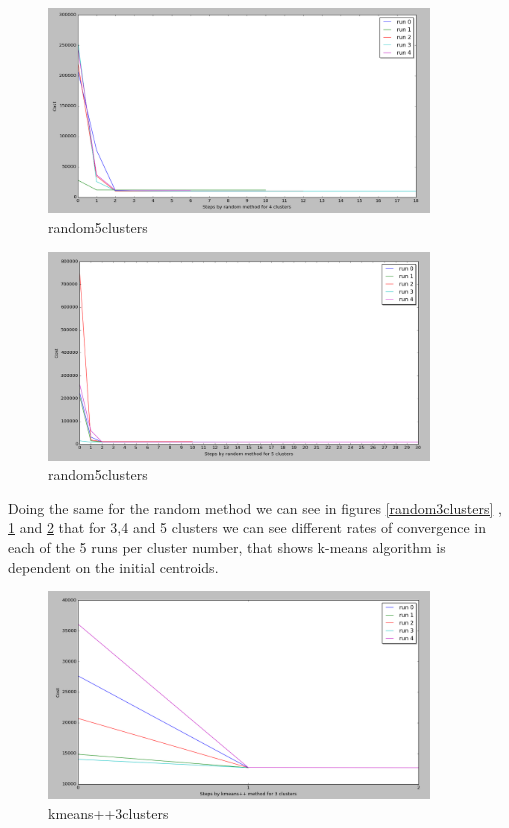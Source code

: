 \begin{figure}[!htb]
\centering
\includegraphics[width=0.9\textwidth]{shots/random4clusters.png}
\caption{ random5clusters}
\label{random4clusters}
\end{figure}



\begin{figure}[!htb]
\centering
\includegraphics[width=0.9\textwidth]{shots/random5clusters.png}
\caption{ random5clusters}
\label{random5clusters}
\end{figure}


Doing the same for the random method we can see in figures \ref{random3clusters} , \ref{random4clusters} and \ref{random5clusters} that for 3,4 and 5 clusters we can see different rates of convergence in each of the 5 runs per cluster number, that shows k-means algorithm is dependent on the initial centroids.

\begin{figure}[!htb]
\centering
\includegraphics[width=0.9\textwidth]{shots/kmeans++3clusters.png}
\caption{kmeans++3clusters }
\label{kmeans++3clusters}
\end{figure}



